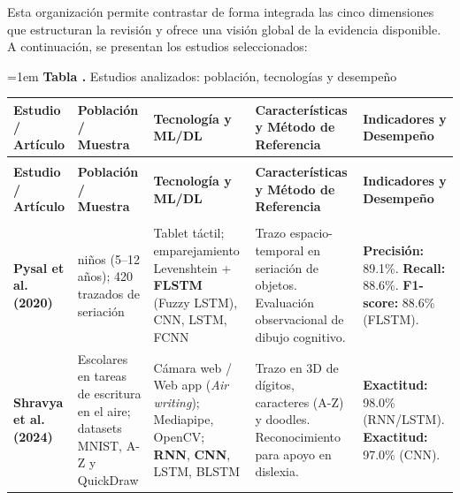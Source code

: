 \documentclass{iaesarticle}
\renewcommand{\arraystretch}{1.3}
\begin{document}
\vspace{0.5em}

Esta organización permite contrastar de forma integrada las cinco dimensiones que estructuran la revisión y ofrece una visión global de la evidencia disponible. A continuación, se presentan los estudios seleccionados:

\begingroup
\small
\setlength{\tabcolsep}{3pt}
\renewcommand{\arraystretch}{1.3}
\emergencystretch=1em
\setlength{\LTleft}{0pt}
\setlength{\LTright}{0pt}
\setlength{\LTcapwidth}{\textwidth}
\captionsetup{justification=raggedright,singlelinecheck=false}
\label{tab:poblacion_desempeno_estudios}
\noindent\textbf{Tabla \thetable.} Estudios analizados: población, tecnologías y desempeño\par
\medskip
\begin{longtable}{|
>{\raggedright\arraybackslash}p{2.3cm}|
>{\raggedright\arraybackslash}p{2.7cm}|
>{\raggedright\arraybackslash}p{2.9cm}|
>{\raggedright\arraybackslash}p{3.5cm}|
>{\raggedright\arraybackslash}p{2.8cm}|}
\hline
\rowcolor{blue!10}
\textbf{Estudio / Artículo} &
\textbf{Población / Muestra} &
\textbf{Tecnología y ML/DL} &
\textbf{Características y Método de Referencia} &
\textbf{Indicadores y Desempeño} \\
\hline
\endfirsthead

\multicolumn{5}{@{}l}{\textit{Continuación de la Tabla \thetable}} \\
\hline
\rowcolor{blue!10}
\textbf{Estudio / Artículo} &
\textbf{Población / Muestra} &
\textbf{Tecnología y ML/DL} &
\textbf{Características y Método de Referencia} &
\textbf{Indicadores y Desempeño} \\
\hline
\endhead

\hline
\multicolumn{5}{r@{}}{\textit{Continúa en la siguiente página}} \\
\endfoot

\hline
\endlastfoot

\textbf{Pysal et al. (2020)} \cite{Pysal2021}
&
32 niños (5--12 años); 420 trazados de seriación
&
Tablet táctil; emparejamiento Levenshtein + \textbf{FLSTM} (Fuzzy LSTM), CNN, LSTM, FCNN
&
Trazo espacio-temporal en seriación de objetos. Evaluación observacional de dibujo cognitivo.
&
\textbf{Precisión:} 89.1\%. \textbf{Recall:} 88.6\%. \textbf{F1-score:} 88.6\% (FLSTM).
\\ \hline

\textbf{Shravya et al. (2024)} \cite{Shravya2024}
&
Escolares en tareas de escritura en el aire; datasets MNIST, A-Z y QuickDraw
&
Cámara web / Web app (\textit{Air writing}); Mediapipe, OpenCV; \textbf{RNN}, \textbf{CNN}, LSTM, BLSTM
&
Trazo en 3D de dígitos, caracteres (A-Z) y doodles. Reconocimiento para apoyo en dislexia.
&
\textbf{Exactitud:} 98.0\% (RNN/LSTM). \textbf{Exactitud:} 97.0\% (CNN).
\\ \hline


\end{longtable}
\end{document}
